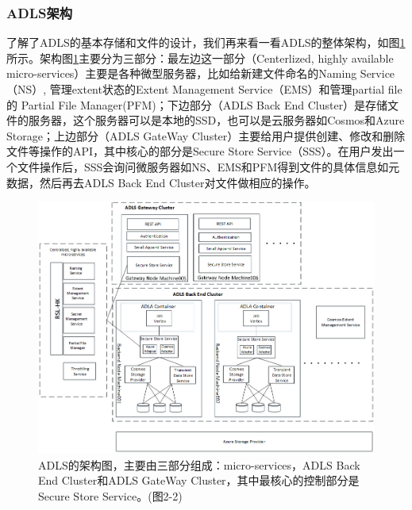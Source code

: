 \documentclass[11pt]{article}
\begin{document}
\subsubsection{ADLS架构}
了解了ADLS的基本存储和文件的设计，我们再来看一看ADLS的整体架构，如图\ref{fig:ADLS-arc}所示。架构图\ref{fig:ADLS-arc}主要分为三部分：最左边这一部分（Centerlized, highly available micro-services）主要是各种微型服务器，比如给新建文件命名的Naming Service（NS）, 管理extent状态的Extent Management Service（EMS）和管理partial file的 Partial File Manager(PFM)；下边部分（ADLS Back End Cluster）是存储文件的服务器，这个服务器可以是本地的SSD，也可以是云服务器如Cosmos和Azure Storage；上边部分（ADLS GateWay Cluster）主要给用户提供创建、修改和删除文件等操作的API，其中核心的部分是Secure Store Service（SSS）。在用户发出一个文件操作后，SSS会询问微服务器如NS、EMS和PFM得到文件的具体信息如元数据，然后再去ADLS Back End Cluster对文件做相应的操作。
\begin{figure}[!htbp]
	\centering
	\includegraphics[width=0.84\linewidth]{figs/ADLS-arc.png}
	\caption{ADLS的架构图，主要由三部分组成：micro-services，ADLS Back End Cluster和ADLS GateWay Cluster，其中最核心的控制部分是Secure Store Service。(\cite{ramakrishnan2017azure}图2-2)}%
	\label{fig:ADLS-arc}
\end{figure}
\end{document}
